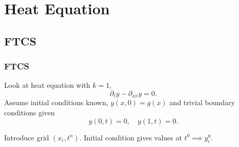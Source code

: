 \documentclass{beamer}
\begin{document}
\section{Heat Equation}


\subsection{FTCS}


\begin{frame}
  \frametitle{FTCS}

  \begin{overlayarea}{\textwidth}{0.8\textheight}
    {
      Look at heat equation with $k=1$,
      \begin{equation*}
        \partial_{t} y - \partial_{x x} y = 0.
      \end{equation*}
    }
    {
      Assume initial conditions known, $y(x, 0) = g(x)$
      and trivial boundary conditions given
      \begin{equation*}
        y(0, t) = 0, \quad y(1, t) = 0.
      \end{equation*}
    }
    {

      Introduce grid $(x_i, t^n)$. Initial condition gives values at
      $t^0 \implies y_i^0$.
    }
    {

      \vspace{1ex}

}
\end{overlayarea}
\end{frame}
\end{document}
